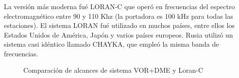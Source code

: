 La versi\'on m\'as moderna fu\'e LORAN-C que oper\'o en frecuencias del espectro electromagn\'etico entre 90 y 110 Khz (la portadora es 100 kHz para todas las estaciones). El sistema LORAN fu\'e utilizado en muchos pa\'ises, entre ellos los Estados Unidos de Am\'erica, Jap\'on y varios pa\'ises europeos. Rusia utiliz\'o un sistema casi id\'entico llamado CHAYKA, que emple\'o la misma banda de frecuencias. 

\begin{figure}[!h]
  \centering
  \hspace{1em}
  \caption{Comparación de alcances de sistema VOR+DME y Loran-C \protect\cite{tooley2017aircraft}}
  \label{fig:06.LoranC.alcances}
\end{figure}



%

